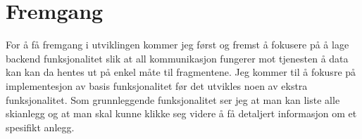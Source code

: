 \documentclass[11pt,a4paper]{article}
\begin{document}
\section*{Fremgang}
For å få fremgang i utviklingen kommer jeg først og fremst å fokusere på å lage backend funksjonalitet slik at all kommunikasjon fungerer mot tjenesten å data kan kan da hentes ut på enkel måte til fragmentene. Jeg kommer til å fokusre på implementesjon av basis funksjonalitet før det utvikles noen av ekstra funksjonalitet. Som grunnleggende funksjonalitet ser jeg at man kan liste alle skianlegg og at man skal kunne klikke seg videre å få detaljert informasjon om et spesifikt anlegg. 
\end{document}

